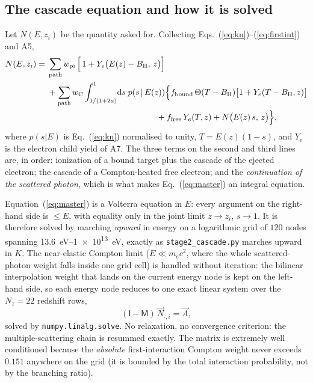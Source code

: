 \documentclass[11pt,a4paper]{article}
\begin{document}
\subsection{The cascade equation and how it is solved}

Let $N(E,z_i)$ be the quantity asked for. Collecting
Eqs.~(\ref{eq:kn})--(\ref{eq:firstint}) and A5,
\begin{align}
  N(E,z_i) =\;& \sum_{\rm path} w_{\rm pi}\,
     \Big[\,1 + Y_e\big(E(z)-B_{\rm H},\,z\big)\Big] \nonumber\\
  &+ \sum_{\rm path} w_{\rm C}
     \int_{1/(1+2a)}^{1}\! \mathrm{d}s\;p(s\,|\,E(z))
     \Big\{ f_{\rm bound}\,\Theta(T-B_{\rm H})
            \big[1 + Y_e(T-B_{\rm H},z)\big] \nonumber\\
  &\hspace{4.6cm}
          + f_{\rm free}\,Y_e(T,z)
          + N\big(E(z)\,s,\,z\big) \Big\},
  \label{eq:master}
\end{align}
where $p(s|E)$ is Eq.~(\ref{eq:kn}) normalised to unity, $T=E(z)(1-s)$, and
$Y_e$ is the electron child yield of A7. The three terms on the second and
third lines are, in order: ionization of a bound target plus the cascade of
the ejected electron; the cascade of a Compton-heated free electron; and the
\emph{continuation of the scattered photon}, which is what makes
Eq.~(\ref{eq:master}) an integral equation.

Equation~(\ref{eq:master}) is a Volterra equation in $E$: every argument on
the right-hand side is $\le E$, with equality only in the joint limit
$z\to z_i$, $s\to1$. It is therefore solved by marching \emph{upward} in
energy on a logarithmic grid of $120$ nodes spanning
\SIrange{13.6}{1e13}{\electronvolt}, exactly as \texttt{stage2\_cascade.py}
marches upward in $K$. The near-elastic Compton limit ($E\ll m_ec^2$, where
the whole scattered-photon weight falls inside one grid cell) is handled
without iteration: the bilinear interpolation weight that lands on the
current energy node is kept on the left-hand side, so each energy node
reduces to one exact linear system over the $N_z=22$ redshift rows,
\begin{equation}
  (\mathsf{I}-\mathsf{M})\,\vec{N}_{\!\cdot,i} = \vec{A} ,
\end{equation}
solved by \texttt{numpy.linalg.solve}. No relaxation, no convergence
criterion: the multiple-scattering chain is resummed exactly. The matrix is
extremely well conditioned because the \emph{absolute} first-interaction
Compton weight never exceeds $0.151$ anywhere on the grid (it is bounded by
the total interaction probability, not by the branching ratio).
\end{document}
